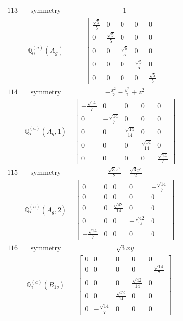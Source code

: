 \documentclass[fleqn,8pt,landscape]{jsarticle}
\begin{document}
\begin{longtable}{ccc}
$ 113 $ & $ \text{symmetry} $ & $ 1 $ \\
$  $ & $ \mathbb{Q}_{0}^{(a)}(A_{g}) $ & $ \begin{bmatrix} \frac{\sqrt{5}}{5} & 0 & 0 & 0 & 0 \\ 0 & \frac{\sqrt{5}}{5} & 0 & 0 & 0 \\ 0 & 0 & \frac{\sqrt{5}}{5} & 0 & 0 \\ 0 & 0 & 0 & \frac{\sqrt{5}}{5} & 0 \\ 0 & 0 & 0 & 0 & \frac{\sqrt{5}}{5} \end{bmatrix} $ \\ \hline
$ 114 $ & $ \text{symmetry} $ & $ - \frac{x^{2}}{2} - \frac{y^{2}}{2} + z^{2} $ \\
$  $ & $ \mathbb{Q}_{2}^{(a)}(A_{g},1) $ & $ \begin{bmatrix} - \frac{\sqrt{14}}{7} & 0 & 0 & 0 & 0 \\ 0 & - \frac{\sqrt{14}}{7} & 0 & 0 & 0 \\ 0 & 0 & \frac{\sqrt{14}}{14} & 0 & 0 \\ 0 & 0 & 0 & \frac{\sqrt{14}}{14} & 0 \\ 0 & 0 & 0 & 0 & \frac{\sqrt{14}}{7} \end{bmatrix} $ \\ \hline
$ 115 $ & $ \text{symmetry} $ & $ \frac{\sqrt{3} x^{2}}{2} - \frac{\sqrt{3} y^{2}}{2} $ \\
$  $ & $ \mathbb{Q}_{2}^{(a)}(A_{g},2) $ & $ \begin{bmatrix} 0 & 0 & 0 & 0 & - \frac{\sqrt{14}}{7} \\ 0 & 0 & 0 & 0 & 0 \\ 0 & 0 & \frac{\sqrt{42}}{14} & 0 & 0 \\ 0 & 0 & 0 & - \frac{\sqrt{42}}{14} & 0 \\ - \frac{\sqrt{14}}{7} & 0 & 0 & 0 & 0 \end{bmatrix} $ \\ \hline
$ 116 $ & $ \text{symmetry} $ & $ \sqrt{3} x y $ \\
$  $ & $ \mathbb{Q}_{2}^{(a)}(B_{1g}) $ & $ \begin{bmatrix} 0 & 0 & 0 & 0 & 0 \\ 0 & 0 & 0 & 0 & - \frac{\sqrt{14}}{7} \\ 0 & 0 & 0 & \frac{\sqrt{42}}{14} & 0 \\ 0 & 0 & \frac{\sqrt{42}}{14} & 0 & 0 \\ 0 & - \frac{\sqrt{14}}{7} & 0 & 0 & 0 \end{bmatrix} $ \\ \hline

\end{longtable}
\end{document}
